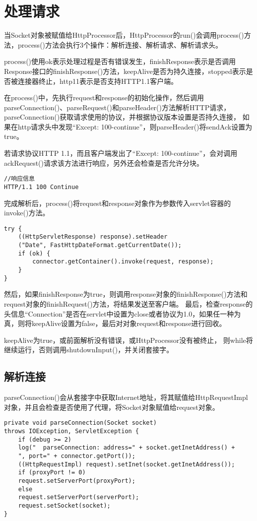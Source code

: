 \section{处理请求}
当Socket对象被赋值给HttpProcessor后，HttpProcessor的run()会调用process()方法，process()方法会执行3个操作：解析连接、解析请求、解析请求头。
\par process()使用ok表示处理过程是否有错误发生，finishResponse表示是否调用Response接口的finishResponse()方法，keepAlive是否为持久连接，stopped表示是否被连接器终止，http11表示是否支持HTTP1.1客户端。
\par 在process()中，先执行request和response的初始化操作，然后调用
parseConnection()、parseRequest()和parseHeader()方法解析HTTP请求，
parseConnection()获取请求使用的协议，并根据协议版本设置是否持久连接，
如果在http请求头中发现“Except: 100-continue”，则parseHeader()将sendAck设置为true。
\par 若请求协议HTTP 1.1，而且客户端发出了“Except: 100-continue”，会对调用
ackRequest()请求该方法进行响应，另外还会检查是否允许分块。
\begin{lstlisting}
//响应信息
HTTP/1.1 100 Continue
\end{lstlisting}
\par 完成解析后，process()将request和response对象作为参数传入servlet容器的invoke()方法。
\begin{lstlisting}
try {
	((HttpServletResponse) response).setHeader
	("Date", FastHttpDateFormat.getCurrentDate());
	if (ok) {
		connector.getContainer().invoke(request, response);
	}
}
\end{lstlisting}
\par 然后，如果finishResponse为true，则调用response对象的finishResponse()方法和request对象的finishRequest()方法，将结果发送至客户端。
最后，检查response的头信息“Connection”是否在servlet中设置为close或者协议为1.0，如果任一种为真，则将keepAlive设置为false，最后对对象request和response进行回收。
\par keepAlive为true，或前面解析没有错误，或HttpProcessor没有被终止，
则while将继续运行，否则调用shutdownInput()，并关闭套接字。
\subsection{解析连接}
parseConnection()会从套接字中获取Internet地址，将其赋值给HttpRequestImpl对象，并且会检查是否使用了代理，将Socket对象赋值给request对象。
\begin{lstlisting}
private void parseConnection(Socket socket)
throws IOException, ServletException {
	if (debug >= 2)
	log("  parseConnection: address=" + socket.getInetAddress() +
	", port=" + connector.getPort());
	((HttpRequestImpl) request).setInet(socket.getInetAddress());
	if (proxyPort != 0)
	request.setServerPort(proxyPort);
	else
	request.setServerPort(serverPort);
	request.setSocket(socket);
}
\end{lstlisting}
